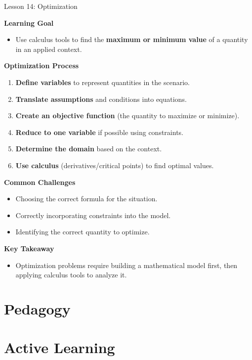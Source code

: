 \documentclass[dvipsnames]{beamer}
\newcommand{\transition}[1]{\frame{{}\begin{center}\fbox{#1}\end{center}}}
\begin{document}
\begin{frame}{Lesson 14: Optimization}

\textbf{Learning Goal}
\begin{itemize}
\item Use calculus tools to find the \textbf{maximum or minimum value} of a quantity in an applied context.
\end{itemize}

\textbf{Optimization Process}
\begin{enumerate}
\item \textbf{Define variables} to represent quantities in the scenario.
\item \textbf{Translate assumptions} and conditions into equations.
\item \textbf{Create an objective function} (the quantity to maximize or minimize).
\item \textbf{Reduce to one variable} if possible using constraints.
\item \textbf{Determine the domain} based on the context.
\item \textbf{Use calculus} (derivatives/critical points) to find optimal values.
\end{enumerate}

\textbf{Common Challenges}
\begin{itemize}
\item Choosing the correct formula for the situation.
\item Correctly incorporating constraints into the model.
\item Identifying the correct quantity to optimize.
\end{itemize}
\end{frame}
\begin{frame}
\textbf{Key Takeaway}
\begin{itemize}
\item Optimization problems require building a mathematical model first, then applying calculus tools to analyze it.
\end{itemize}

\end{frame}


\section{Pedagogy}

\transition{Pedagogy}
\section{Active Learning}
\end{document}
